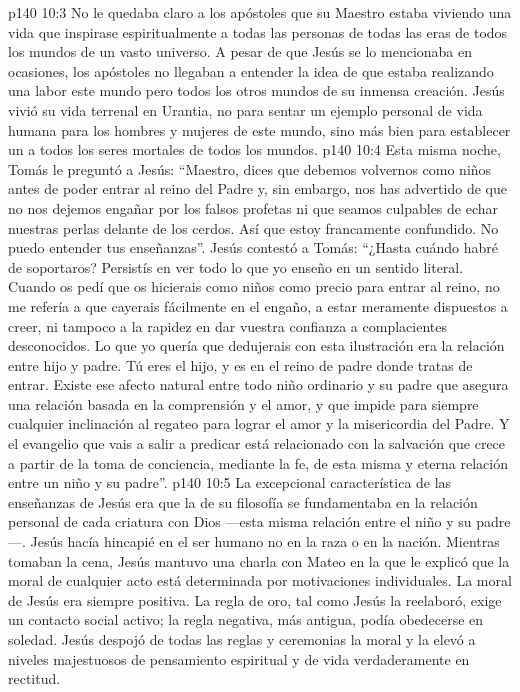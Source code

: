 \vs p140 10:3 No le quedaba claro a los apóstoles que su Maestro estaba viviendo una vida que inspirase espiritualmente a todas las personas de todas las eras de todos los mundos de un vasto universo. A pesar de que Jesús se lo mencionaba en ocasiones, los apóstoles no llegaban a entender la idea de que estaba realizando una labor  este mundo pero  todos los otros mundos de su inmensa creación. Jesús vivió su vida terrenal en Urantia, no para sentar un ejemplo personal de vida humana para los hombres y mujeres de este mundo, sino más bien para establecer un  a todos los seres mortales de todos los mundos.
\vs p140 10:4 \pc Esta misma noche, Tomás le preguntó a Jesús: “Maestro, dices que debemos volvernos como niños antes de poder entrar al reino del Padre y, sin embargo, nos has advertido de que no nos dejemos engañar por los falsos profetas ni que seamos culpables de echar nuestras perlas delante de los cerdos. Así que estoy francamente confundido. No puedo entender tus enseñanzas”. Jesús contestó a Tomás: “¿Hasta cuándo habré de soportaros? Persistís en ver todo lo que yo enseño en un sentido literal. Cuando os pedí que os hicierais como niños como precio para entrar al reino, no me refería a que cayerais fácilmente en el engaño, a estar meramente dispuestos a creer, ni tampoco a la rapidez en dar vuestra confianza a complacientes desconocidos. Lo que yo quería que dedujerais con esta ilustración era la relación entre hijo y padre. Tú eres el hijo, y es en el reino de  padre donde tratas de entrar. Existe ese afecto natural entre todo niño ordinario y su padre que asegura una relación basada en la comprensión y el amor, y que impide para siempre cualquier inclinación al regateo para lograr el amor y la misericordia del Padre. Y el evangelio que vais a salir a predicar está relacionado con la salvación que crece a partir de la toma de conciencia, mediante la fe, de esta misma y eterna relación entre un niño y su padre”.
\vs p140 10:5 \pc La excepcional característica de las enseñanzas de Jesús era que la  de su filosofía se fundamentaba en la relación personal de cada criatura con Dios ---esta misma relación entre el niño y su padre---. Jesús hacía hincapié en el ser humano  no en la raza o en la nación. Mientras tomaban la cena, Jesús mantuvo una charla con Mateo en la que le explicó que la moral de cualquier acto está determinada por motivaciones individuales. La moral de Jesús era siempre positiva. La regla de oro, tal como Jesús la reelaboró, exige un contacto social activo; la regla negativa, más antigua, podía obedecerse en soledad. Jesús despojó de todas las reglas y ceremonias la moral y la elevó a niveles majestuosos de pensamiento espiritual y de vida verdaderamente en rectitud.
